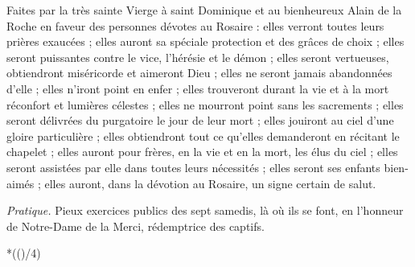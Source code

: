 \documentclass{bibliotheca-missel}
\begin{document}
\renewcommand{\fruitlabel}{Fruit :}
\begin{notice}
Faites par la très sainte Vierge à saint Dominique et au bienheureux Alain de la Roche en faveur des personnes dévotes au Rosaire : elles verront toutes leurs prières exaucées ; elles auront sa spéciale protection et des grâces de choix ; elles seront puissantes contre le vice, l’hérésie et le démon ; elles seront vertueuses, obtiendront miséricorde et aimeront Dieu ; elles ne seront jamais abandonnées d’elle ; elles n’iront point en enfer ; elles trouveront durant la vie et à la mort réconfort et lumières célestes ; elles ne mourront point sans les sacrements ; elles seront délivrées du purgatoire le jour de leur mort ; elles jouiront au ciel d’une gloire particulière ; elles obtiendront tout ce qu’elles demanderont en récitant le chapelet ; elles auront pour frères, en la vie et en la mort, les élus du ciel ; elles seront assistées par elle dans toutes leurs nécessités ; elles seront ses enfants bien-aimés ; elles auront, dans la dévotion au Rosaire, un signe certain de salut.
\end{notice}

\begin{notice}\textit{Pratique.} Pieux exercices publics des sept samedis, là où ils se font, en l’honneur de Notre-Dame de la Merci, rédemptrice des captifs.\end{notice}
\culdelampe

\clearpage
\thispagestyle{empty}
{\raggedright\fleuronpetit{}\vspace{1mm}{\color{rubrique}\rule{12mm}{0.4pt}}\par}\vspace{3mm}
{\fontsize{8.6}{10.2}\selectfont\makeatletter{}\makeatother}

\clearpage
\loop\ifnum\numexpr{}*(()/4) \else\null\thispagestyle{empty}\clearpage\repeat
\end{document}
